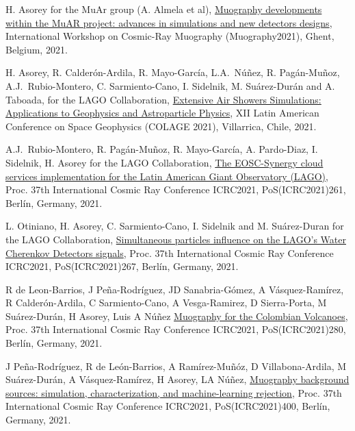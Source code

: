 \begin{etaremune}
\item {} H. Asorey for the MuAr group (A. Almela et al), \href{https://indico.cern.ch/event/1033631/contributions/4530674/}{Muography developments within the MuAR project: advances in simulations and new detectors designs}, \en International Workshop on Cosmic-Ray Muography (Muography2021), Ghent, Belgium, 2021.

\item {} H. Asorey, R. Calderón-Ardila, R. Mayo-García, L.A.\ Núñez, R. Pagán-Muñoz, A.J.\ Rubio-Montero, C. Sarmiento-Cano, I. Sidelnik, M. Suárez-Durán and A. Taboada, for the LAGO Collaboration, \href{https://ccc.ciencias.uchile.cl/2021colage/abstracts/Hern%C3%A1n%20Asorey.pdf}{Extensive Air Showers Simulations: Applications to Geophysics and Astroparticle Physics}, \en XII Latin American Conference on Space Geophysics (COLAGE 2021), Villarrica, Chile, 2021.

\item {} A.J.\ Rubio-Montero, R. Pagán-Muñoz, R. Mayo-García, A. Pardo-Diaz, I. Sidelnik, H. Asorey for the LAGO Collaboration, \href{https://doi.org/10.22323/1.395.0261}{The EOSC-Synergy cloud services implementation for the Latin American Giant Observatory (LAGO)}, \en Proc.
37th International Cosmic Ray Conference ICRC2021, PoS(ICRC2021)261, Berlín, Germany, 2021.

\item {} L. Otiniano, H. Asorey, C. Sarmiento-Cano, I. Sidelnik and M. Suárez-Duran for the LAGO Collaboration, \href{https://doi.org/10.22323/1.395.0267}{Simultaneous particles influence on the LAGO’s Water Cherenkov Detectors signals}, \en Proc.
37th International Cosmic Ray Conference ICRC2021, PoS(ICRC2021)267, Berlín, Germany, 2021.

\item {} R de Leon-Barrios, J Peña-Rodríguez, JD Sanabria-Gómez, A Vásquez-Ramírez, R Calderón-Ardila, C Sarmiento-Cano, A Vesga-Ramirez, D Sierra-Porta, M Suárez-Durán, H Asorey, Luis A Núñez \href{https://doi.org/10.22323/1.395.0280}{Muography for the Colombian Volcanoes}, \en Proc.
37th International Cosmic Ray Conference ICRC2021, PoS(ICRC2021)280, Berlín, Germany, 2021.

\item {} J Peña-Rodríguez, R de León-Barrios, A Ramírez-Muñóz, D Villabona-Ardila, M Suárez-Durán, A Vásquez-Ramírez, H Asorey, LA Núñez, \href{https://doi.org/10.22323/1.395.0400}{Muography background sources: simulation, characterization, and machine-learning rejection}, \en Proc.
37th International Cosmic Ray Conference ICRC2021, PoS(ICRC2021)400, Berlín, Germany, 2021.


\end{etaremune}
